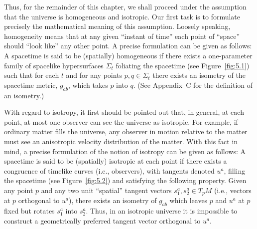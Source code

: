 Thus, for the remainder of this chapter, we shall proceed under the assumption that
the universe is homogeneous and isotropic. Our first task is to formulate precisely
the mathematical meaning of this assumption. Loosely speaking, homogeneity means
that at any given ``instant of time'' each point of ``space'' should ``look like'' any
other point. A precise formulation can be given as follows: A spacetime is said to be
(spatially) homogeneous if there exists a one-parameter family of spacelike
hypersurfaces \(\Sigma_t\) foliating the spacetime (see Figure~\ref{fig:5.1}) such that
for each \(t\) and for any points \(p,q\in\Sigma_t\) there exists an isometry of the
spacetime metric, \(g_{ab}\), which takes \(p\) into \(q\). (See Appendix~C for the
definition of an isometry.)



With regard to isotropy, it first should be pointed out that, in general, at each
point, at most one observer can see the universe as isotropic. For example, if
ordinary matter fills the universe, any observer in motion relative to the matter must
see an anisotropic velocity distribution of the matter. With this fact in mind, a precise
formulation of the notion of isotropy can be given as follows: A spacetime is said to
be (spatially) isotropic at each point if there exists a congruence of timelike curves
(i.e., observers), with tangents denoted \(u^a\), filling the spacetime (see
Figure~\ref{fig:5.2}) and satisfying the following property. Given any point \(p\) and
any two unit ``spatial'' tangent vectors \(s_1^a,s_2^a\in T_pM\) (i.e., vectors at
\(p\) orthogonal to \(u^a\)), there exists an isometry of \(g_{ab}\) which leaves \(p\)
and \(u^a\) at \(p\) fixed but rotates \(s_1^a\) into \(s_2^a\). Thus, in an isotropic
universe it is impossible to construct a geometrically preferred tangent vector
orthogonal to \(u^a\).



